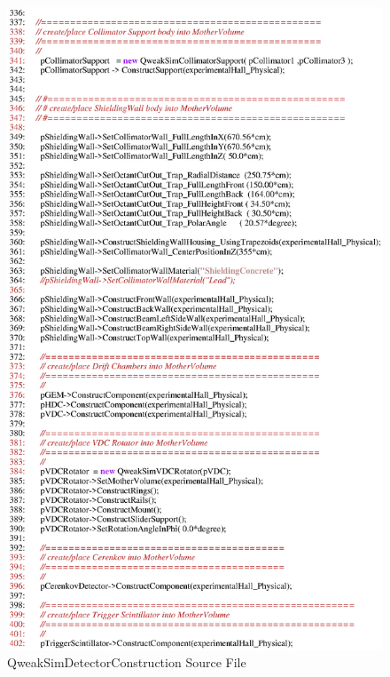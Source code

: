 \begin{figure}[ht]
  \hspace{0cm}
  \includegraphics[scale=0.8]{./figures4/QweakSimDetectorConstruction.cc-p6.eps}
  \caption{\label{QweakSimDetectorConstruction} QweakSimDetectorConstruction Source File}
           \label{fig:V-SC-10}
\end{figure}
\clearpage

